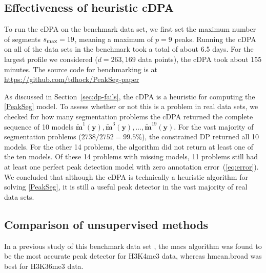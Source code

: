 \documentclass{article}
\begin{document}
\subsection{Effectiveness of heuristic cDPA}

To run the cDPA on the benchmark data set, we first set the maximum
number of segments $s_{\text{\text{max}}}=19$, meaning a maximum of $p=9$
peaks. Running the cDPA on all of the data sets in the benchmark took
a total of about 6.5 days. For the largest profile we considered
($d=263,169$ data points), the cDPA took
about 155 minutes. The source code for benchmarking 
is at\\
\url{https://github.com/tdhock/PeakSeg-paper}

As discussed in Section~\ref{sec:dp-fails}, the cDPA is a heuristic
for computing the \ref{PeakSeg} model. To assess whether or not this
is a problem in real data sets, we checked for how many segmentation
problems the cDPA returned the complete sequence of 10 models
$\mathbf{\tilde m}^1(\mathbf y),\mathbf{\tilde m}^3(\mathbf y), \dots,
\mathbf{\tilde m}^{19}(\mathbf y)$. For the vast majority of
segmentation problems ($2738/2752=99.5\%$), the constrained DP returned
all 10 models. For the other 14 problems, the algorithm did not return
at least one of the ten models. Of these 14 problems with missing
models, 11 problems still had at least one perfect peak detection
model with zero annotation error~(\ref{eq:error}). We concluded that
although the cDPA is technically a heuristic algorithm for
solving \ref{PeakSeg}, it is still a useful peak detector in the vast
majority of real data sets.



\subsection{Comparison of unsupervised methods}

In a previous study of this benchmark data set
\citep{hocking2014visual}, the macs algorithm was found to be the most
accurate peak detector for H3K4me3 data, whereas hmcan.broad was best
for H3K36me3 data.
\end{document}
